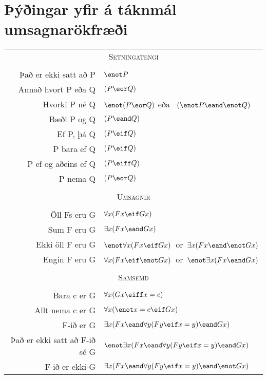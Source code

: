 \section{Þýðingar yfir á táknmál umsagnarökfræði}
\begin{center}
\label{app.symbolization}
\begin{tabular*}{\textwidth}{rl}
\multicolumn{2}{c}{\textsc{Setningatengi}}\\ \\
Það er ekki satt að P & $\enot P$\\
Annað hvort P eða Q& $(P \eor Q)$\\
Hvorki P né Q &$\enot(P \eor Q)$ eða \ $(\enot P \eand \enot Q)$\\
Bæði P og Q & $(P \eand Q)$\\
Ef P, þá Q & $(P \eif Q)$\\
P bara ef Q & $(P \eif Q)$\\
P ef og aðeins ef Q & $(P \eiff Q)$\\
P nema Q & $(P \eor Q)$\\
\\
\multicolumn{2}{c}{\label{SymbolizingPredicates}\textsc{Umsagnir}}\\ \\
Öll Fs eru G & $\forall x(Fx \eif Gx)$\\
Sum F eru G & $\exists x(Fx \eand Gx)$\\
Ekki öll F eru G & $\enot\forall x(Fx \eif Gx)$\ or\ $\exists x(Fx \eand \enot Gx)$\\
Engin F eru G & $\forall x(Fx \eif\enot Gx)$\ or\ $\enot\exists x(Fx \eand Gx)$\\
\\
\multicolumn{2}{c}{\textsc{Samsemd}}\\ \\
Bara c er G & $\forall x(Gx \eiff x=c)$\\
Allt nema c er G & $\forall x(\enot x = c \eif Gx)$\\
F-ið er G & $\exists x(Fx \eand \forall y(Fy \eif x=y) \eand Gx)$\\
Það er ekki satt að F-ið sé G & $\enot\exists x(Fx \eand \forall y(Fy \eif x=y) \eand Gx)$\\
F-ið er ekki-G & $\exists x(Fx \eand \forall y(Fy \eif x=y) \eand \enot Gx)$
\end{tabular*}
\end{center}






